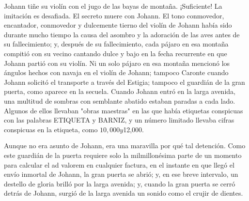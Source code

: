 \documentclass[12pt]{book}
\begin{document}
Johann tiñe su violín con el jugo de las bayas de montaña. ¡Suficiente! La imitación es desafiada. El secreto muere con Johann. El tono conmovedor, encantador, conmovedor y dulcemente tierno del violín de Johann había sido durante mucho tiempo la causa del asombro y la adoración de las aves antes de su fallecimiento; y, después de su fallecimiento, cada pájaro en esa montaña compitió con su vecino cantando dulce y bajo en la fecha recurrente en que Johann partió con su violín. Ni un solo pájaro en esa montaña mencionó los ángulos hechos con navaja en el violín de Johann; tampoco Caronte cuando Johann solicitó el transporte a través del Estigia; tampoco el guardián de la gran puerta, como aparece en la secuela. Cuando Johann entró en la larga avenida, una multitud de sombras con semblante abatido estaban paradas a cada lado. Algunos de ellos llevaban "obras maestras" en las que había etiquetas conspicuas con las palabras ETIQUETA y BARNIZ, y un número limitado llevaba cifras conspicuas en la etiqueta, como $10,000 y $12,000.

Aunque no era asunto de Johann, era una maravilla por qué tal detención. Como este guardián de la puerta requiere solo la milmillonésima parte de un momento para calcular el ad valorem en cualquier factura, en el instante en que llegó el envío inmortal de Johann, la gran puerta se abrió; y, en ese breve intervalo, un destello de gloria brilló por la larga avenida; y, cuando la gran puerta se cerró detrás de Johann, surgió de la larga avenida un sonido como el crujir de dientes.
\end{document}

